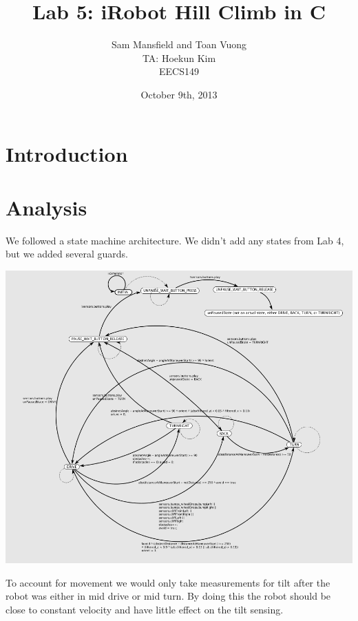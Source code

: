 \documentclass[10pt,titlepage]{article}
\begin{document}
  \title{Lab 5: iRobot Hill Climb in C}
  \author{Sam Mansfield and Toan Vuong \\
          TA: Hoekun Kim \\
          EECS149}
  \date{October 9th, 2013}
  \maketitle

  \section{Introduction}

  \section{Analysis}

    We followed a state machine architecture. We didn't add any states from Lab 4, but we added several guards.
    \begin{center} 
      \includegraphics[width=\textwidth]{../lab5_data/FSMLab5}
    \end{center}
    
    To account for movement we would only take measurements for tilt after the robot was either in mid drive or mid turn. By doing this the robot should be close to constant velocity and have little effect on the tilt sensing.
\end{document}
